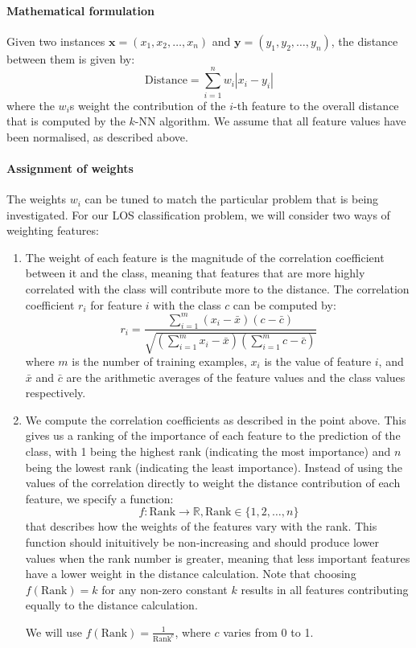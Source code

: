 \paragraph{Mathematical formulation}
Given two instances $\mathbf{x} = (x_1,x_2,\ldots,x_n)$ and
$\mathbf{y} = (y_1,y_2,\ldots,y_n)$, the distance between them is given by:
\begin{equation*}
\mathrm{Distance} = \sum_{i=1}^n w_i |x_i-y_i|
\end{equation*}
where the $w_i$s weight the contribution of the $i$-th feature to the overall
distance that is computed by the $k$-NN algorithm. We assume that all feature
values have been normalised, as described above.

\paragraph{Assignment of weights}
The weights $w_i$ can be tuned to match the particular problem that is being
investigated. For our LOS classification problem, we will consider two ways
of weighting features:
\begin{enumerate}
\item The weight of each feature is the magnitude of the correlation
coefficient
between it and the class, meaning that features that are more highly correlated
with the class will contribute more to the distance. The correlation
coefficient $r_i$ for feature $i$ with the class $c$ can be computed by:
\begin{equation*}
r_i = \dfrac{\sum_{i=1}^m (x_i-\bar{x})(c-\bar{c})}{\sqrt{(\sum_{i=1}^m x_i-\bar{x})(\sum_{i=1}^m c-\bar{c})}}
\end{equation*}
where $m$ is the number of training examples, $x_i$ is the value of feature
$i$, and $\bar{x}$ and $\bar{c}$ are the arithmetic averages of the feature
values and the class values respectively. 
\item We compute the correlation coefficients as described in the point above.
This gives us a ranking of the importance of each feature to the prediction of
the class, with 1 being the highest rank (indicating the most importance) and
$n$ being the lowest rank (indicating the least importance).
Instead of using the values of the correlation directly to weight
the distance contribution of each feature, we specify a function:
\begin{equation*}
f : \mathrm{Rank} \rightarrow \mathbb{R}, \mathrm{Rank} \in \{1,2,\ldots,n\}
\end{equation*}
that describes
how the weights of the features vary with the rank. This function should
inituitively be non-increasing and should produce lower values when the rank
number is greater, meaning that less important features have a lower weight
in the distance calculation.
Note that choosing $f(\mathrm{Rank}) = k$ for any non-zero constant $k$
results in all features contributing equally to the distance calculation.

\noindent We will use $f(\mathrm{Rank}) = \frac{1}{\mathrm{Rank}^c}$, where
$c$ varies from 0 to 1.
\end{enumerate}

